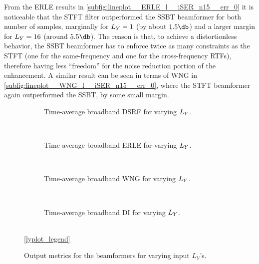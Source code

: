 From the ERLE results in \cref{subfig:lineplot__ERLE_l__iSER_n15__err_0} it is noticeable that the STFT filter outperformed the SSBT beamformer for both number of samples, marginally for $\Ly = 1$ (by about $1.5\dB$) and a larger margin for $\Ly = 16$ (around $5.5 \dB$). The reason is that, to achieve a distortionless behavior, the SSBT beamformer has to enforce twice as many constraints as the STFT (one for the same-frequency and one for the cross-frequency RTFs), therefore having less ``freedom'' for the noise reduction portion of the enhancement. A similar result can be seen in terms of WNG in \cref{subfig:lineplot__WNG_l__iSER_n15__err_0}, where the STFT beamformer again outperformed the SSBT, by some small margin.



\begin{figure}[!ht]
	\centering
	\begin{subfigure}{\textwidth}
		\centering
		
		\caption{Time-average broadband DSRF for varying $\Ly$.}
		\label{subfig:lineplot__DSRF__iSER_n15__Ly_var__err_0}
	\end{subfigure}\\[1em]
	\begin{subfigure}{\textwidth}
		\centering
		
		\caption{Time-average broadband ERLE for varying $\Ly$.}
		\label{subfig:lineplot__ERLE__iSER_n15__Ly_var__err_0}
	\end{subfigure}\\[1em]
	\begin{subfigure}{\textwidth}
		\centering
		
		\caption{Time-average broadband WNG for varying $\Ly$.}
		\label{subfig:lineplot__WNG__iSER_n15__Ly_var__err_0}
	\end{subfigure}\\[1em]
	\begin{subfigure}{\textwidth}
		\centering
		
		\caption{Time-average broadband DI for varying $\Ly$.}
		\label{subfig:lineplot__DI__iSER_n15__Ly_var__err_0}
	\end{subfigure}\\[1em]
	\ref*{lyplot_legend}
	\caption{Output metrics for the beamformers for varying input $L_Y$'s.}
	\label{fig:lineplot__iSER_n15__Ly_var__err_0}
\end{figure}

